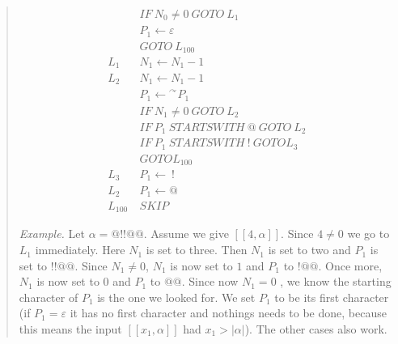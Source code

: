 \documentclass[a4paper, 12pt]{article}
\begin{document}
\small
\begin{quote}


\begin{align*}
    &IF ~ N_0 \neq 0 ~ GOTO ~ L_1 \\ 
    &P_1 \leftarrow \varepsilon \\ 
    & GOTO ~ L_{100} \\
    L_1 ~ & N_1 \leftarrow N_1 - 1 \\ 
    L_2 ~ & N_1 \leftarrow N_1 - 1 \\ 
          &P_1 \leftarrow {}^{\curvearrowright} P_1\\
    &IF ~ N_1 \neq 0 ~ GOTO ~ L_2\\
    &IF ~ P_1 ~ STARTSWITH ~ @ ~ GOTO ~ L_2 \\ 
    &IF ~ P_1 ~ STARTSWITH ~ ! ~ GOTO L_3\\ 
    & GOTO L_{100}\\
    L_3~&P_1 \leftarrow ~ !\\
    L_2 ~ &P_1 \leftarrow  @ \\ 
    L_{100} ~ & SKIP
\end{align*}

\textit{Example.} Let $\alpha = @!!@@$. Assume we give $[\![ 4, \alpha ]\!]$.
Since $4 \neq 0$ we go to $L_1$ immediately. Here $N_1$ is set to three. Then
$N_1$ is set to two and $P_1$ is set to $!!@@$. Since $N_1 \neq 0$, $N_1$ is now
set to $1$ and $P_1$ to $!@@$. Once more, $N_1$ is now set to $0$ and $P_1$ to
$@@$. Since now $N_1 = 0$ , we know the starting character of $P_1$ is the one
we looked for. We set $P_1$ to be its first character (if $P_1 = \varepsilon$ it
has no first character and nothings needs to be done, because this means the
input $[\![ x_1, \alpha ]\!]$ had $x_1 > |\alpha|$). The other cases also work.

\end{quote}
\normalsize
\end{document}
